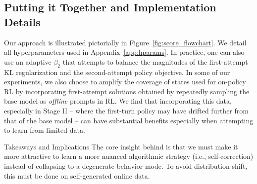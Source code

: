\vspace{-0.2cm}
\subsection{Putting it Together and Implementation Details} 
\label{sec:hparams}
\vspace{-0.2cm}

Our approach is illustrated pictorially in Figure~\ref{fig:score_flowchart}. We detail all hyperparameters used in Appendix~\ref{app:hparams}. In practice, one can also use an adaptive $\beta_2$ that attempts to balance the magnitudes of the first-attempt KL regularization and the second-attempt policy objective. In some of our experiments, we also choose to amplify the coverage of states used for on-policy RL by incorporating first-attempt solutions obtained by repeatedly sampling the base model as \emph{offline} prompts in RL. We find that incorporating this data, especially in Stage II -- where the first-turn policy may have drifted further from that of the base model -- can have substantial benefits especially when attempting to learn from limited data.

\begin{AIbox}{Takeaways and Implications}
The core insight behind \methodname{} is that we must make it more attractive to learn a more nuanced algorithmic strategy (i.e., self-correction) instead of collapsing to a degenerate behavior mode. To avoid distribution shift, this must be done on self-generated online data. 
\end{AIbox}




